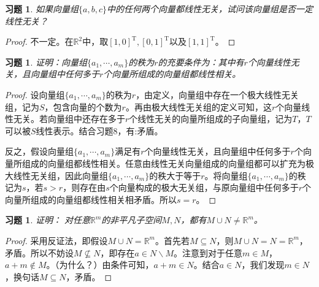 \documentclass[UTF8]{ctexart}
\newtheorem{ex}[thm]{习题}
\begin{document}
\begin{ex}
如果向量组$\{a, b, c\}$中的任何两个向量都线性无关，试问该向量组是否一定线性无关？
\end{ex}
\begin{proof}
不一定。在$\mathbb{R}^2$中，取$[1,0]^{\mathrm{T}}, [0,1]^{\mathrm{T}}$以及$[1,1]^{\mathrm{T}}$。
\end{proof}



\begin{ex}
证明：向量组$\{a_1, \cdots, a_m\}$的秩为$r$的充要条件为：其中有$r$个向量线性无关，且向量组中任何多于$r$个向量所组成的向量组都线性相关。
\end{ex}
\begin{proof}
设向量组$\{a_1, \cdots, a_m\}$的秩为$r$，由定义，向量组中存在一个极大线性无关组，记为$S$，包含向量的个数为$r$。再由极大线性无关组的定义可知，这$r$个向量线性无关。若向量组中还存在多于$r$个线性无关的向量所组成的子向量组，记为$T$，$T$可以被$S$线性表示。结合习题8，有:矛盾。
\

反之，假设向量组$\{a_1, \cdots, a_m\}$满足有$r$个向量线性无关，且向量组中任何多于$r$个向量所组成的向量组都线性相关。任意由线性无关向量组成的向量组都可以扩充为极大线性无关组，因此向量组$\{a_1, \cdots, a_m\}$的秩大于等于$r$。将向量组$\{a_1, \cdots, a_m\}$的秩记为$s$，若$s > r$，则存在由$s$个向量构成的极大无关组，与原向量组中任何多于$r$个向量所组成的向量组都线性相关相矛盾。所以$s = r$。
\end{proof}




\begin{ex}
证明： 对任意$\mathbb{R}^m$的非平凡子空间$M, N$，都有$M \cup N \neq \mathbb{R}^m$。
\end{ex}
\begin{proof}
采用反证法，即假设$M \cup N = \mathbb{R}^m$。首先若$M \subseteq N$，则$M \cup N = N = \mathbb{R}^m$，矛盾。所以不妨设$M \nsubseteq N$，即存在$a \in N \backslash M$。注意到对于任意$m \in M$，$a+m \notin M$。（为什么？）由条件可知，$a+m \in N$。结合$a \in N$，我们发现$m \in N$，换句话$M \subseteq N$，矛盾。
\end{proof}
\end{document}
